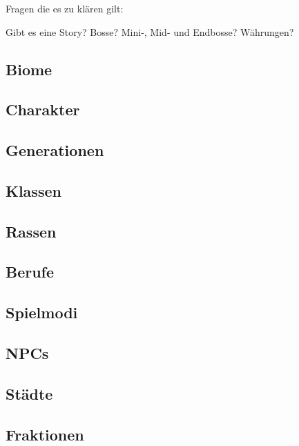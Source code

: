 Fragen die es zu klären gilt:

    Gibt es eine Story?
    Bosse? Mini-, Mid- und Endbosse?
    Währungen?

\subsection{Biome}
\label{subsec:biome}

\subsection{Charakter}
\label{subsec:charakter}

\subsection{Generationen}
\label{subsec:generationen}

\subsection{Klassen}
\label{subsec:klassen}

\subsection{Rassen}
\label{subsec:rassen}

\subsection{Berufe}
\label{subsec:berufe}

\subsection{Spielmodi}
\label{subsec:spielmodi}

\subsection{NPCs}
\label{subsec:NPCs}

\subsection{Städte}
\label{subsec:staedte}

\subsection{Fraktionen}
\label{subsec:Fraktionen}

